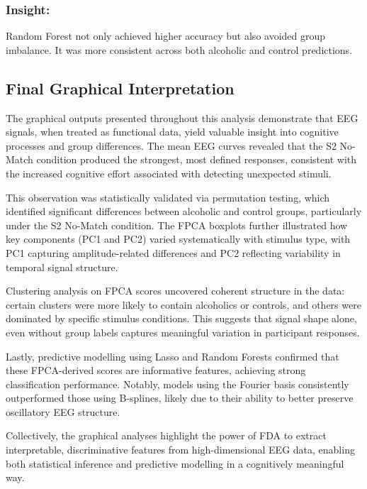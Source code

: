 \documentclass{article}
\begin{document}
\subsubsection{Insight:}\label{insight}

Random Forest not only achieved higher accuracy but also avoided group
imbalance. It was more consistent across both alcoholic and control
predictions.

\subsection{Final Graphical
Interpretation}\label{final-graphical-interpretation}

The graphical outputs presented throughout this analysis demonstrate
that EEG signals, when treated as functional data, yield valuable
insight into cognitive processes and group differences. The mean EEG
curves revealed that the S2 No-Match condition produced the strongest,
most defined responses, consistent with the increased cognitive effort
associated with detecting unexpected stimuli.

This observation was statistically validated via permutation testing,
which identified significant differences between alcoholic and control
groups, particularly under the S2 No-Match condition. The FPCA boxplots
further illustrated how key components (PC1 and PC2) varied
systematically with stimulus type, with PC1 capturing amplitude-related
differences and PC2 reflecting variability in temporal signal structure.

Clustering analysis on FPCA scores uncovered coherent structure in the
data: certain clusters were more likely to contain alcoholics or
controls, and others were dominated by specific stimulus conditions.
This suggests that signal shape alone, even without group labels
captures meaningful variation in participant responses.

Lastly, predictive modelling using Lasso and Random Forests confirmed
that these FPCA-derived scores are informative features, achieving
strong classification performance. Notably, models using the Fourier
basis consistently outperformed those using B-splines, likely due to
their ability to better preserve oscillatory EEG structure.

Collectively, the graphical analyses highlight the power of FDA to
extract interpretable, discriminative features from high-dimensional EEG
data, enabling both statistical inference and predictive modelling in a
cognitively meaningful way.
\end{document}
